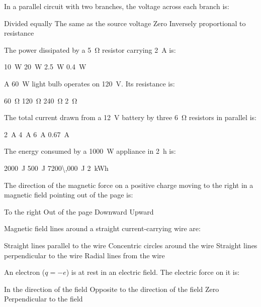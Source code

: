 \documentclass[addpoints]{exam}
\begin{document}
\begin{questions}
\question[1] In a parallel circuit with two branches, the voltage across each branch is:
\begin{choices}
    \choice Divided equally
    \correctchoice The same as the source voltage
    \choice Zero
    \choice Inversely proportional to resistance
\end{choices}

\question[1] The power dissipated by a \SI{5}{\ohm} resistor carrying \SI{2}{A} is:
\begin{choices}
    \choice \SI{10}{W}
    \correctchoice \SI{20}{W}
    \choice \SI{2.5}{W}
    \choice \SI{0.4}{W}
\end{choices}

\question[1] A \SI{60}{W} light bulb operates on \SI{120}{V}. Its resistance is:
\begin{choices}
    \choice \SI{60}{\ohm}
    \choice \SI{120}{\ohm}
    \correctchoice \SI{240}{\ohm}
    \choice \SI{2}{\ohm}
\end{choices}

\question[1] The total current drawn from a \SI{12}{V} battery by three \SI{6}{\ohm}
resistors in parallel is:
\begin{choices}
    \choice \SI{2}{A}
    \choice \SI{4}{A}
    \correctchoice \SI{6}{A}
    \choice \SI{0.67}{A}
\end{choices}

\question[1] The energy consumed by a \SI{1000}{W} appliance in \SI{2}{h} is:
\begin{choices}
    \choice \SI{2000}{J}
    \choice \SI{500}{J}
    \correctchoice \SI{7200\,000}{J}
    \choice \SI{2}{kWh}
\end{choices}

\question[1] The direction of the magnetic force on a positive charge moving to the
right in a magnetic field pointing out of the page is:
\begin{choices}
    \choice To the right
    \choice Out of the page
    \correctchoice Downward
    \choice Upward
\end{choices}

\question[1] Magnetic field lines around a straight current-carrying wire are:
\begin{choices}
    \choice Straight lines parallel to the wire
    \correctchoice Concentric circles around the wire
    \choice Straight lines perpendicular to the wire
    \choice Radial lines from the wire
\end{choices}

\question[1] An electron ($q = -e$) is at rest in an electric field. The electric force
on it is:
\begin{choices}
    \choice In the direction of the field
    \correctchoice Opposite to the direction of the field
    \choice Zero
    \choice Perpendicular to the field
\end{choices}



\end{questions}
\end{document}
